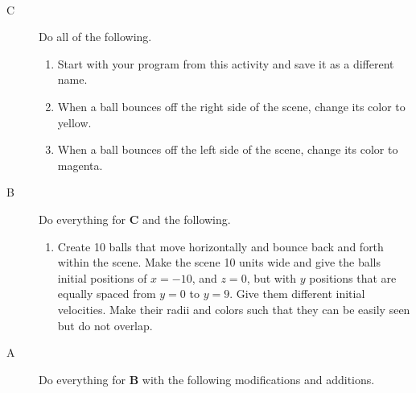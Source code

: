 \ \\

\newpage


\analysis

\begin{description}

\item[C] Do all of the following.
\begin{enumerate}
	\item Start with your program from this activity and save it as a different name.
	\item When a ball bounces off the right side of the scene, change its color to yellow. 
	\item When a ball bounces off the left side of the scene, change its color to magenta.
\end{enumerate}

\item[B] Do everything for {\bf C} and the following.

\begin{enumerate}
	\item Create 10 balls that move horizontally and bounce back and forth within the scene. Make the scene 10 units wide and give the balls initial positions of $x=-10$, and $z=0$, but with $y$ positions that are equally spaced from $y=0$ to $y=9$. Give them different initial velocities. Make their radii and colors such that they can be easily seen but do not overlap.
\end{enumerate}

\item[A] Do everything for {\bf B} with the following modifications and additions.


\end{description}
